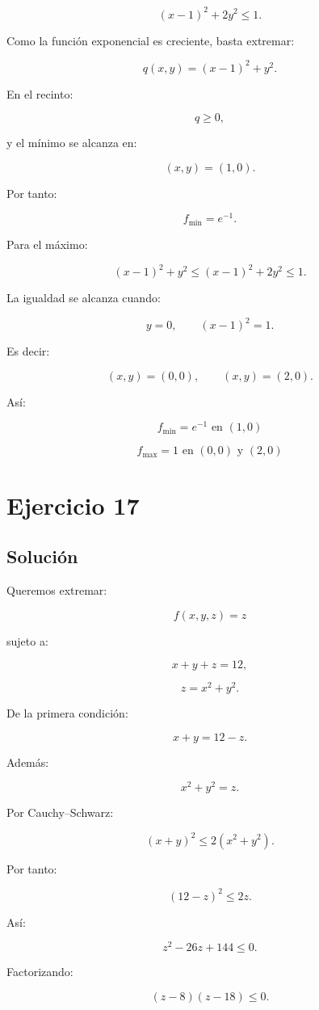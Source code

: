 \documentclass[11pt,a4paper]{article}
\begin{document}
\[
(x-1)^2+2y^2\leq1.
\]

Como la función exponencial es creciente, basta extremar:

\[
q(x,y)
=
(x-1)^2+y^2.
\]

En el recinto:

\[
q\geq0,
\]

y el mínimo se alcanza en:

\[
(x,y)=(1,0).
\]

Por tanto:

\[
f_{\min}
=
e^{-1}.
\]

Para el máximo:

\[
(x-1)^2+y^2
\leq
(x-1)^2+2y^2
\leq1.
\]

La igualdad se alcanza cuando:

\[
y=0,
\qquad
(x-1)^2=1.
\]

Es decir:

\[
(x,y)=(0,0),
\qquad
(x,y)=(2,0).
\]

Así:

\[
\boxed{
f_{\min}
=
e^{-1}
\text{ en }(1,0)
}
\]

\[
\boxed{
f_{\max}
=
1
\text{ en }(0,0)\text{ y }(2,0)
}
\]

\section{Ejercicio 17}
\subsection{Solución}

Queremos extremar:

\[
f(x,y,z)=z
\]

sujeto a:

\[
x+y+z=12,
\]

\[
z=x^2+y^2.
\]

De la primera condición:

\[
x+y=12-z.
\]

Además:

\[
x^2+y^2=z.
\]

Por Cauchy--Schwarz:

\[
(x+y)^2
\leq
2(x^2+y^2).
\]

Por tanto:

\[
(12-z)^2\leq2z.
\]

Así:

\[
z^2-26z+144\leq0.
\]

Factorizando:

\[
(z-8)(z-18)\leq0.
\]
\end{document}
